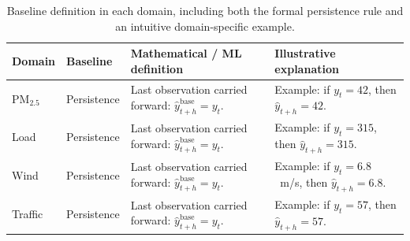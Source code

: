 \begin{table}[t]
\centering
\scriptsize
\setlength{\tabcolsep}{4pt}
\renewcommand{\arraystretch}{1.15}
\begin{tabularx}{\linewidth}{@{}l l >{\raggedright\arraybackslash}X >{\raggedright\arraybackslash}X@{}}
\toprule
Domain & Baseline & Mathematical / ML definition & Illustrative explanation \\
\midrule
PM$_{2.5}$ & Persistence &
  Last observation carried forward: $\hat{y}^{\mathrm{base}}_{t+h} = y_t$. &
  Example: if $y_t = 42$, then $\hat{y}_{t+h} = 42$. \\
Load & Persistence &
  Last observation carried forward: $\hat{y}^{\mathrm{base}}_{t+h} = y_t$. &
  Example: if $y_t = 315$, then $\hat{y}_{t+h} = 315$. \\
Wind & Persistence &
  Last observation carried forward: $\hat{y}^{\mathrm{base}}_{t+h} = y_t$. &
  Example: if $y_t = 6.8$~m/s, then $\hat{y}_{t+h} = 6.8$. \\
Traffic & Persistence &
  Last observation carried forward: $\hat{y}^{\mathrm{base}}_{t+h} = y_t$. &
  Example: if $y_t = 57$, then $\hat{y}_{t+h} = 57$. \\
\bottomrule
\end{tabularx}
\caption{Baseline definition in each domain, including both the formal persistence rule and an intuitive domain-specific example.}
\label{tab:baselines}
\end{table}
